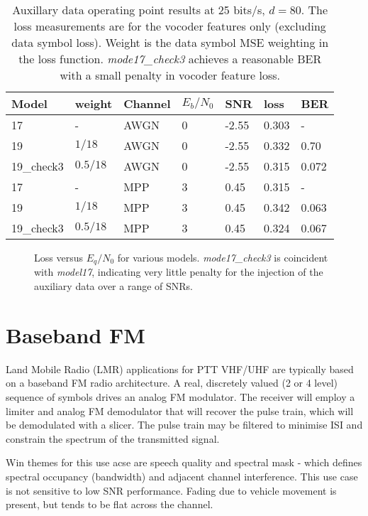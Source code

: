 \documentclass{article}
\begin{document}
\begin{table} [H]
\centering
\begin{tabular}{ l | l | l | l | l | l | l}
 \hline
 Model & weight & Channel & $E_b/N_0$ & SNR & loss & BER \\
 \hline
 17 & - & AWGN & 0 & -2.55 & 0.303 & - \\
 19 & $1/18$ & AWGN & 0 & -2.55 & 0.332 & 0.70 \\
 19\_check3 & $0.5/18$ & AWGN & 0 & -2.55 & 0.315 & 0.072 \\
 17 & - & MPP & 3 & 0.45 & 0.315 & - \\
 19 & $1/18$ & MPP & 3 & 0.45 & 0.342 & 0.063 \\
 19\_check3 & $0.5/18$ & MPP & 3 & 0.45 & 0.324 & 0.067 \\
 \hline
\end{tabular}
\caption{Auxillary data operating point results at 25 bits/s, $d=80$. The loss measurements are for the vocoder features only (excluding data symbol loss). Weight is the data symbol MSE weighting in the loss function. \emph{mode17\_check3} achieves a reasonable BER with a small penalty in vocoder feature loss.}
\label{tab:acq_data}
\end{table}

\begin{figure}[H]
\caption{Loss versus $E_q/N_0$ for various models. \emph{mode17\_check3} is coincident with  \emph{model17}, indicating very little penalty for the injection of the auxiliary data over a range of SNRs.}
\label{fig:loss_eqno_models}
\begin{center}

\end{center}
\end{figure}

\section{Baseband FM}

Land Mobile Radio (LMR) applications for PTT VHF/UHF are typically based on a baseband FM radio architecture. A real, discretely valued (2 or 4 level) sequence of symbols drives an analog FM modulator.  The receiver will employ a limiter and analog FM demodulator that will recover the pulse train, which will be demodulated with a slicer.  The pulse train may be filtered to minimise ISI and constrain the spectrum of the transmitted signal.

Win themes for this use acse are speech quality and spectral mask - which defines spectral occupancy (bandwidth) and adjacent channel interference. This use case is not sensitive to low SNR performance.  Fading due to vehicle movement is present, but tends to be flat across the channel.
\end{document}
